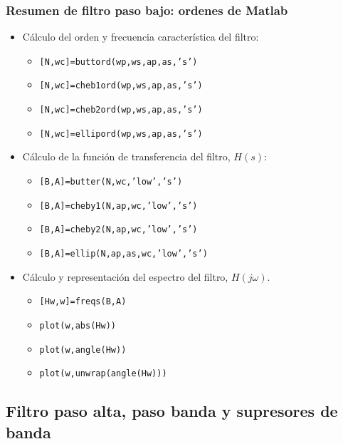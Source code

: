 \begin{frame}\frametitle{Resumen de filtro paso bajo: ordenes de Matlab}

  \begin{itemize}
    \item Cálculo del orden y frecuencia característica del filtro:
    \begin{itemize}
      \item \alert{\texttt{[N,wc]=buttord(wp,ws,ap,as,'s')}}
      \item \alert{\texttt{[N,wc]=cheb1ord(wp,ws,ap,as,'s')}}
      \item \alert{\texttt{[N,wc]=cheb2ord(wp,ws,ap,as,'s')}}
      \item \alert{\texttt{[N,wc]=ellipord(wp,ws,ap,as,'s')}}
    \end{itemize}
      \item Cálculo de la función de transferencia del filtro, $H(s)$:
    \begin{itemize}
      \item \alert{\texttt{[B,A]=butter(N,wc,'low','s')}}
      \item \alert{\texttt{[B,A]=cheby1(N,ap,wc,'low','s')}}
      \item \alert{\texttt{[B,A]=cheby2(N,ap,wc,'low','s')}}
      \item \alert{\texttt{[B,A]=ellip(N,ap,as,wc,'low','s')}}
    \end{itemize}
      \item Cálculo y representación del espectro del filtro, $H(j\omega)$.
    \begin{itemize}
      \item \alert{\texttt{[Hw,w]=freqs(B,A)}}
      \item \alert{\texttt{plot(w,abs(Hw))}}
      \item \alert{\texttt{plot(w,angle(Hw))}}
      \item \alert{\texttt{plot(w,unwrap(angle(Hw)))}}
    \end{itemize}
  \end{itemize}

\end{frame}




\subsection{Filtro paso alta, paso banda y supresores de banda}

